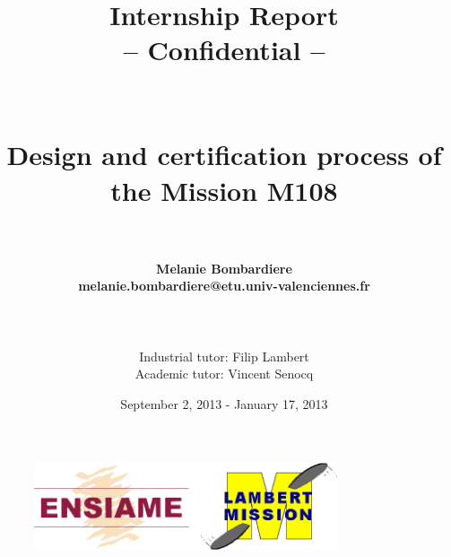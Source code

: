 \documentclass[11pt,a4paper]{article}
\begin{document}
\title{~\\
~\\
\textbf{Internship Report}\\
-- Confidential --\\
~\\
~\\
Design and certification process of the Mission M108\\
~\\}

\author{
  \textbf{Melanie Bombardiere}\\
  \textbf{melanie.bombardiere@etu.univ-valenciennes.fr}\\
  \\
  \\
  \\
  Industrial tutor: Filip Lambert\\
  Academic tutor: Vincent Senocq
}
\date{September 2, 2013 - January 17, 2013}

\begin{figure}[position]
  \centering
  \includegraphics[width=0.8\textwidth]{pics/logo.png}
\end{figure}

\maketitle

\newpage

\setcounter{page}{1} 

\pagestyle{fancy}
\fancyhead{}
\fancyhead[L]{\leftmark}

\fancyfoot{}

\begin{spacing}{1.5}
\tableofcontents
\end{spacing}

\newpage
\end{document}
